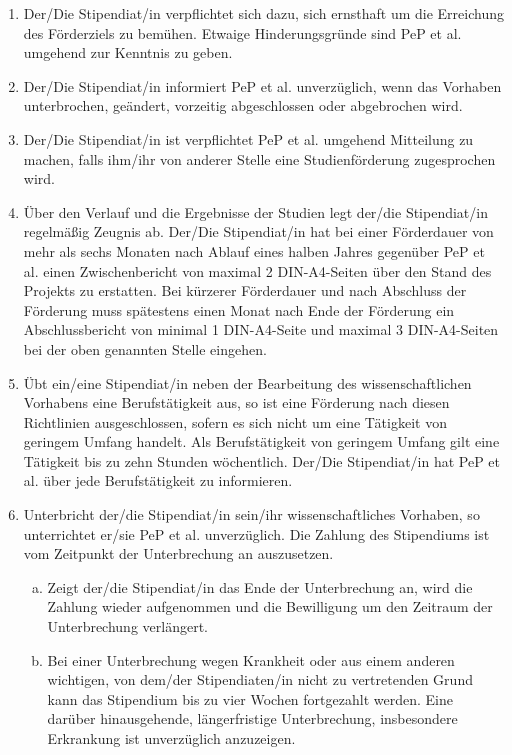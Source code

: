 \documentclass[
  paper=a4,
  fontsize=12pt,
  DIV=16,
  parskip=full,
  headinclude=true,
]{scrartcl}
\begin{document}
\begin{enumerate}[\qquad(1)]
	\item Der/Die Stipendiat/in verpflichtet sich dazu, sich ernsthaft um die
		Erreichung des Förderziels zu bemühen. Etwaige Hinderungsgründe sind
		PeP et al. umgehend zur Kenntnis zu geben.
	\item Der/Die Stipendiat/in informiert PeP et al. unverzüglich, wenn das
		Vorhaben unterbrochen, geändert, vorzeitig abgeschlossen oder
		abgebrochen wird.
	\item Der/Die Stipendiat/in ist verpflichtet PeP et al. umgehend
		Mitteilung zu machen, falls ihm/ihr von anderer Stelle eine
		Studienförderung zugesprochen wird.
	\item Über den Verlauf und die Ergebnisse der Studien legt der/die
		Stipendiat/in regelmäßig Zeugnis ab. Der/Die Stipendiat/in
		hat bei einer Förderdauer von mehr als sechs Monaten nach Ablauf
		eines halben Jahres gegenüber PeP et al. einen Zwischenbericht
		von maximal 2 DIN-A4-Seiten über den Stand des Projekts zu
		erstatten. Bei kürzerer Förderdauer und nach Abschluss der
		Förderung muss spätestens einen Monat nach Ende der Förderung
		ein Abschlussbericht von minimal 1 DIN-A4-Seite und maximal
		3 DIN-A4-Seiten bei der oben genannten Stelle eingehen.
	\item Übt ein/eine Stipendiat/in neben der Bearbeitung des wissenschaftlichen
		Vorhabens eine Berufstätigkeit aus, so ist eine Förderung nach diesen
		Richtlinien ausgeschlossen, sofern es sich nicht um eine Tätigkeit von
		geringem Umfang handelt.
		Als Berufstätigkeit von geringem Umfang gilt eine Tätigkeit bis zu zehn
		Stunden wöchentlich. Der/Die Stipendiat/in hat PeP et al. über
		jede Berufstätigkeit zu informieren.
	\item Unterbricht der/die Stipendiat/in sein/ihr wissenschaftliches Vorhaben,
		so unterrichtet er/sie PeP et al. unverzüglich. Die Zahlung des
		Stipendiums ist vom Zeitpunkt der Unterbrechung an auszusetzen.
		\begin{enumerate}[(a)]
			\item  Zeigt der/die Stipendiat/in das Ende der Unterbrechung
				an, wird die Zahlung wieder aufgenommen und die
				Bewilligung um den Zeitraum der Unterbrechung verlängert.
			\item Bei einer Unterbrechung wegen Krankheit oder aus einem
				anderen wichtigen, von dem/der Stipendiaten/in nicht
				zu vertretenden Grund kann das Stipendium bis zu
				vier Wochen fortgezahlt werden. Eine darüber
				hinausgehende, längerfristige Unterbrechung,
				insbesondere Erkrankung ist unverzüglich anzuzeigen.
		\end{enumerate}
\end{enumerate}
\end{document}
